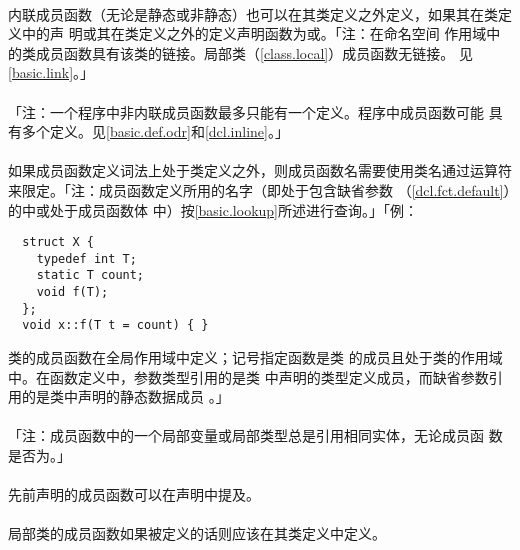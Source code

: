 \paragraph{}
内联成员函数（无论是静态或非静态）也可以在其类定义之外定义，如果其在类定义中的声
明或其在类定义之外的定义声明函数为或。「注：在命名空间
作用域中的类成员函数具有该类的链接。局部类（\ref{class.local}）成员函数无链接。
见\ref{basic.link}。」

\paragraph{}
「注：一个程序中非内联成员函数最多只能有一个定义。程序中成员函数可能
具有多个定义。见\ref{basic.def.odr}和\ref{dcl.inline}。」

\paragraph{}
如果成员函数定义词法上处于类定义之外，则成员函数名需要使用类名通过\tm{::}运算符
来限定。「注：成员函数定义所用的名字（即处于包含缺省参数
（\ref{dcl.fct.default}）的中或处于成员函数体
中）按\ref{basic.lookup}所述进行查询。」「例：
\begin{lstlisting}
  struct X {
    typedef int T;
    static T count;
    void f(T);
  };
  void x::f(T t = count) { }
\end{lstlisting}
类的成员函数在全局作用域中定义；记号指定函数是类
的成员且处于类的作用域中。在函数定义中，参数类型引用的是类
中声明的类型定义成员，而缺省参数引用的是类中声明的静态数据成员
。」

\paragraph{}
「注：成员函数中的一个局部变量或局部类型总是引用相同实体，无论成员函
数是否为。」

\paragraph{}
先前声明的成员函数可以在声明中提及。

\paragraph{}
局部类的成员函数如果被定义的话则应该在其类定义中定义。

